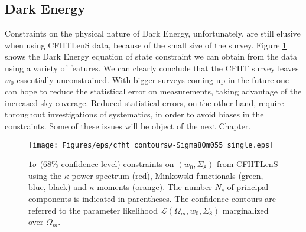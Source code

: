 \subsection{Dark Energy}
Constraints on the physical nature of Dark Energy, unfortunately, are still elusive when using CFHTLenS data, because of the small size of the survey. Figure \ref{fig:6:cwSi855signle} shows the Dark Energy equation of state constraint we can obtain from the data using a variety of features. We can clearly conclude that the CFHT survey leaves $w_0$ essentially unconstrained. With bigger surveys coming up in the future one can hope to reduce the statistical error on measurements, taking advantage of the increased sky coverage. Reduced statistical errors, on the other hand, require throughout investigations of systematics, in order to avoid biases in the constraints. Some of these issues will be object of the next Chapter. 
%
\begin{figure}[h!]
\begin{center}
\texttt{[image: Figures/eps/cfht\_contoursw-Sigma8Om055\_single.eps]}
\end{center}
\caption{$1\sigma$ (68\% confidence level) constraints on $(w_0,\Sigma_8)$ from CFHTLenS using the $\kappa$ power spectrum (red), Minkowski functionals (green, blue, black) and $\kappa$ moments (orange). The number $N_c$ of principal components is indicated in parentheses. The confidence contours are referred to the parameter likelihood $\mathcal{L}(\Omega_m,w_0,\Sigma_8)$ marginalized over $\Omega_m$.}
\label{fig:6:cwSi855signle}
\end{figure}


